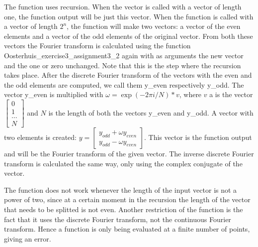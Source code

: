 \documentclass[12pt]{article}
\begin{document}
The function uses recursion. When the vector is called with a vector of length one, the function output will be just this vector. When the function is called with a vector of length $2^n$, the function will make two vectors: a vector of the even elements and a vector of the odd elements of the original vector. From both these vectors the Fourier transform is calculated using the function Oosterhuis\_exercise3\_assignment3\_2 again with as arguments the new vector and the one or zero unchanged. Note that this is the step where the recursion takes place. After the discrete Fourier transform of the vectors with the even and the odd elements are computed, we call them y\_even respectively y\_odd. The vector y\_even is multiplied with $\omega = \exp(-2 \pi i / N) * v $, where $v$ a is the vector $\begin{bmatrix} 0 \\ 1 \\ \dots \\ N \end{bmatrix} $ and $N$ is the length of both the vectors y\_even and y\_odd. A vector with two elements is created: $y = \begin{bmatrix} y_{odd} + \omega y_{even} \\ y_{odd} - \omega y_{even} \end{bmatrix}$. This vector is the function output and will be the Fourier transform of the given vector.
The inverse discrete Fourier transform is calculated the same way, only using the complex conjugate of the vector.%

%
The function does not work whenever the length of the input vector is not a power of two, since at a certain moment in the recursion the length of the vector that needs to be splitted is not even. Another restriction of the function is the fact that it uses the discrete Fourier transform, not the continuous Fourier transform. Hence a function is only being evaluated at a finite number of points, giving an error. %
\end{document}
